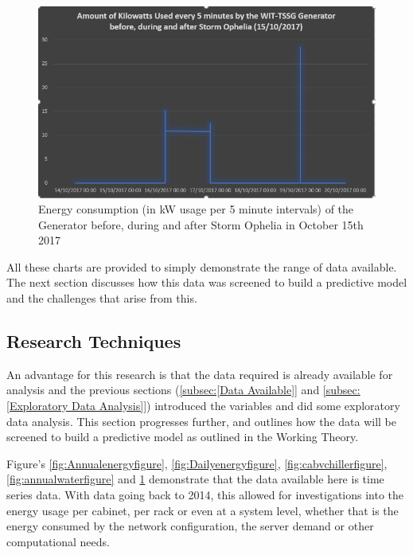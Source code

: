 \documentclass[12pt]{scrartcl}
\begin{document}
\begin{figure}[h]
  \caption{Energy consumption (in kW usage per 5 minute intervals) of the Generator before, during and after Storm Ophelia in October 15th 2017}
  \label{fig:opheliafigure}
  \centering
    \includegraphics[scale=0.50]{Ophelia_generator}
\end{figure} 

All these charts are provided to simply demonstrate the range of data available. The next section discusses how this data was screened to build a predictive model and the challenges that arise from this.  

\subsection{Research Techniques}
\label{subsec:[Research Techniques]}
An advantage for this research is that the data required is already available for analysis and the previous sections (\ref{subsec:[Data Available]} and \ref{subsec:[Exploratory Data Analysis]}) introduced the variables and did some exploratory data analysis. This section progresses further, and outlines how the data will be screened to build a predictive model as outlined in the Working Theory. 

Figure's \ref{fig:Annualenergyfigure}, \ref{fig:Dailyenergyfigure}, \ref{fig:cabvchillerfigure}, \ref{fig:annualwaterfigure} and \ref{fig:opheliafigure} demonstrate that the data available here is time series data. With data going back to 2014, this allowed for investigations into the energy usage per cabinet, per rack or even at a system level, whether that is the energy consumed by the network configuration, the server demand or other computational needs. 
\end{document}
